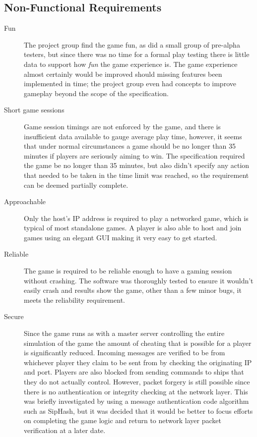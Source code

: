 \subsection{Non-Functional Requirements}
\begin{description}
  \item[Fun] The project group find the game fun, as did a small group of pre-alpha testers, but since there was no time for a formal play testing there is little data to support how \emph{fun} the game experience is. The game experience almost certainly would be improved should missing features been implemented in time; the project group even had concepts to improve gameplay beyond the scope of the specification.
    
  \item[Short game sessions] Game session timings are not enforced by the game, and there is insufficient data available to gauge average play time, however, it seems that under normal circumstances a game should be no longer than 35 minutes if players are seriously aiming to win. The specification required the game be no longer than 35 minutes, but also didn't specify any action that needed to be taken in the time limit was reached, so the requirement can be deemed partially complete.

  \item[Approachable] Only the host's IP address is required to play a networked game, which is typical of most standalone games. A player is also able to host and join games using an elegant GUI making it very easy to get started.

  \item[Reliable] The game is required to be reliable enough to have a gaming session without crashing. The software was thoroughly tested to ensure it wouldn't easily crash and results show the game, other than a few minor bugs, it meets the reliability requirement.

  \item[Secure] Since the game runs as with a master server controlling the entire simulation of the game the amount of cheating that is possible for a player is significantly reduced. Incoming messages are verified to be from whichever player they claim to be sent from by checking the originating IP and port. Players are also blocked from sending commands to ships that they do not actually control. However, packet forgery is still possible since there is no authentication or integrity checking at the network layer. This was briefly investigated by using a message authentication code algorithm such as SipHash,\cite{aumasson2012siphash} but it was decided that it would be better to focus efforts on completing the game logic and return to network layer packet verification at a later date.

\end{description}


